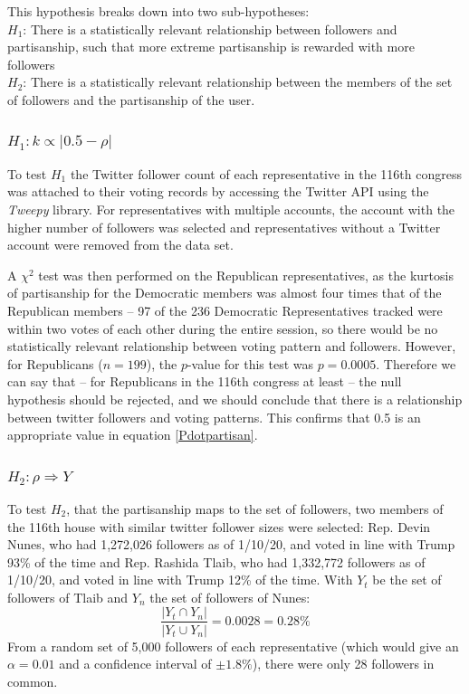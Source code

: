 \documentclass[preprint,review,12pt]{elsarticle}
\begin{document}
This hypothesis breaks down into two sub-hypotheses: \\
\textbf{$H_1$}: There is a statistically relevant relationship between followers and partisanship, such that more extreme partisanship is rewarded with more followers \\
\textbf{$H_2$}: There is a statistically relevant relationship between the members of the set of followers and the partisanship of the user.

 \subsubsection{$H_1: k \propto |0.5 - \rho|$}
  \label{$H_1: k \propto |0.5 - \rho|$}
 To test $H_1$ the Twitter follower count of each representative in the 116th congress was attached to their voting records by accessing the Twitter API using the \textit{Tweepy} library. For representatives with multiple accounts, the account with the higher number of followers was selected and representatives without a Twitter account were removed from the data set. 

A $\chi^2$ test was then performed on the Republican representatives, as the kurtosis of partisanship for the Democratic members was almost four times that of the Republican members -- 97 of the 236 Democratic Representatives tracked were within two votes of each other during the entire session, so there would be no statistically relevant relationship between voting pattern and followers. However, for Republicans ($n = 199$), the $p$-value for this test was $p=0.0005$. Therefore we can say that -- for Republicans in the 116th congress at least -- the null hypothesis should be rejected, and we should conclude that there is a relationship between twitter followers and voting patterns. This confirms that 0.5 is an appropriate value in equation \ref{Pdotpartisan}.

\subsubsection{$H_2: \rho \Rightarrow Y$}
\label{$H_2: \rho \Rightarrow Y$}
To test $H_2$, that the partisanship maps to the set of followers, two members of the 116th house with similar twitter follower sizes were selected: Rep. Devin Nunes, who had 1,272,026 followers as of 1/10/20, and voted in line with Trump 93\% of the time and Rep. Rashida Tlaib, who had 1,332,772 followers as of 1/10/20, and voted in line with Trump 12\% of the time. With $Y_t$ be the set of followers of Tlaib and $Y_n$ the set of followers of Nunes: 
\begin{equation}
\frac{|Y_t \cap Y_n|}{|Y_t \cup Y_n|} = 0.0028 = 0.28\%
\end{equation}
From a random set of 5,000 followers of each representative (which would give an $\alpha = 0.01$ and a confidence interval of $\pm 1.8\%$), there were only 28 followers in common.
\end{document}
